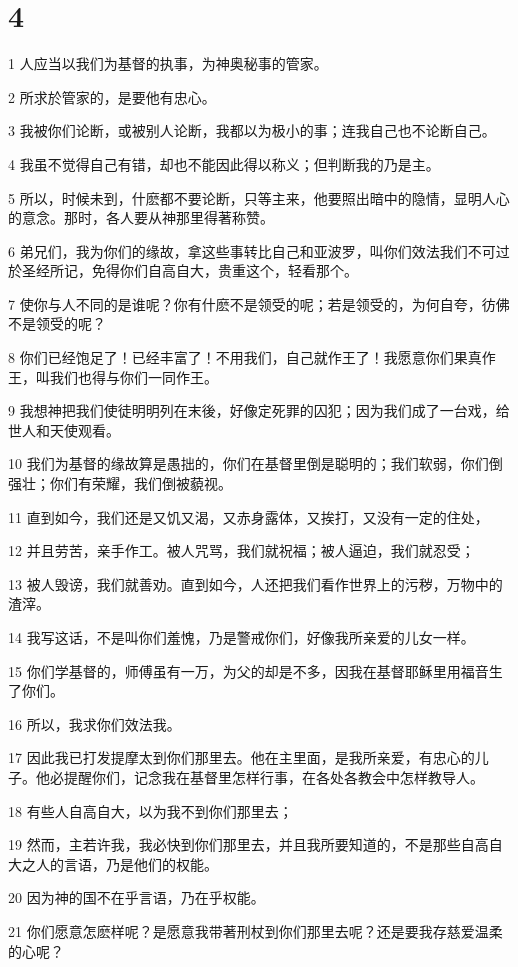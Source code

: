\chapter{4}

\par 1 人应当以我们为基督的执事，为神奥秘事的管家。
\par 2 所求於管家的，是要他有忠心。
\par 3 我被你们论断，或被别人论断，我都以为极小的事；连我自己也不论断自己。
\par 4 我虽不觉得自己有错，却也不能因此得以称义；但判断我的乃是主。
\par 5 所以，时候未到，什麽都不要论断，只等主来，他要照出暗中的隐情，显明人心的意念。那时，各人要从神那里得著称赞。
\par 6 弟兄们，我为你们的缘故，拿这些事转比自己和亚波罗，叫你们效法我们不可过於圣经所记，免得你们自高自大，贵重这个，轻看那个。
\par 7 使你与人不同的是谁呢？你有什麽不是领受的呢；若是领受的，为何自夸，彷佛不是领受的呢？
\par 8 你们已经饱足了！已经丰富了！不用我们，自己就作王了！我愿意你们果真作王，叫我们也得与你们一同作王。
\par 9 我想神把我们使徒明明列在末後，好像定死罪的囚犯；因为我们成了一台戏，给世人和天使观看。
\par 10 我们为基督的缘故算是愚拙的，你们在基督里倒是聪明的；我们软弱，你们倒强壮；你们有荣耀，我们倒被藐视。
\par 11 直到如今，我们还是又饥又渴，又赤身露体，又挨打，又没有一定的住处，
\par 12 并且劳苦，亲手作工。被人咒骂，我们就祝福；被人逼迫，我们就忍受；
\par 13 被人毁谤，我们就善劝。直到如今，人还把我们看作世界上的污秽，万物中的渣滓。
\par 14 我写这话，不是叫你们羞愧，乃是警戒你们，好像我所亲爱的儿女一样。
\par 15 你们学基督的，师傅虽有一万，为父的却是不多，因我在基督耶稣里用福音生了你们。
\par 16 所以，我求你们效法我。
\par 17 因此我已打发提摩太到你们那里去。他在主里面，是我所亲爱，有忠心的儿子。他必提醒你们，记念我在基督里怎样行事，在各处各教会中怎样教导人。
\par 18 有些人自高自大，以为我不到你们那里去；
\par 19 然而，主若许我，我必快到你们那里去，并且我所要知道的，不是那些自高自大之人的言语，乃是他们的权能。
\par 20 因为神的国不在乎言语，乃在乎权能。
\par 21 你们愿意怎麽样呢？是愿意我带著刑杖到你们那里去呢？还是要我存慈爱温柔的心呢？

